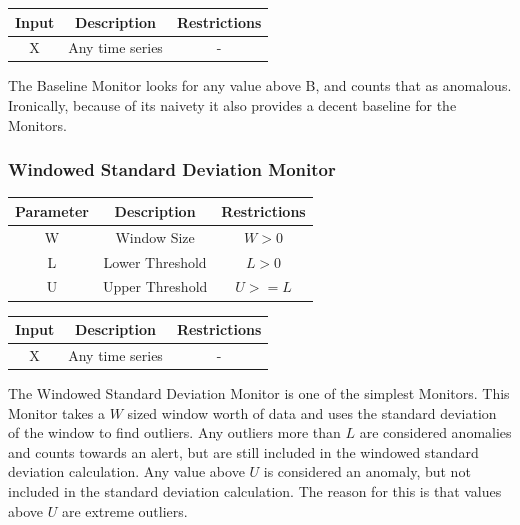 \documentclass[12pt]{ucthesis}
\begin{document}
\begin{table}[H]
   \begin{center}
      \begin{tabular}{|c|c|c|}
         \hline
            Input & Description & Restrictions \\
         \hline
            X & Any time series & - \\
         \hline
      \end{tabular}
   \end{center}
\end{table}

The Baseline Monitor looks for any value above B, and counts that as anomalous.
Ironically, because of its naivety it also provides a decent baseline for the Monitors.

\subsubsection{Windowed Standard Deviation Monitor}
\label{outage-detection-monitors-WindowStdDev}
\begin{table}[H]
   \begin{center}
      \begin{tabular}{|c|c|c|}
         \hline
            Parameter & Description & Restrictions \\
         \hline
            W & Window Size & $ W > 0 $\\
         \hline
            L & Lower Threshold & $L > 0 $\\
         \hline
            U & Upper Threshold & $U >= L $\\
         \hline
      \end{tabular}
   \end{center}
\end{table}

\begin{table}[H]
   \begin{center}
      \begin{tabular}{|c|c|c|}
         \hline
            Input & Description & Restrictions \\
         \hline
            X & Any time series & - \\
         \hline
      \end{tabular}
   \end{center}
\end{table}

The Windowed Standard Deviation Monitor is one of the simplest Monitors. This Monitor takes a $W$ sized window worth of data
and uses the standard deviation of the window to find outliers. Any outliers more than $L$ are considered anomalies and counts towards
an alert, but are still included in the windowed standard deviation calculation. Any value above $U$ is considered an anomaly, but not included
in the standard deviation calculation. The reason for this is that values above $U$ are extreme outliers.
\end{document}
